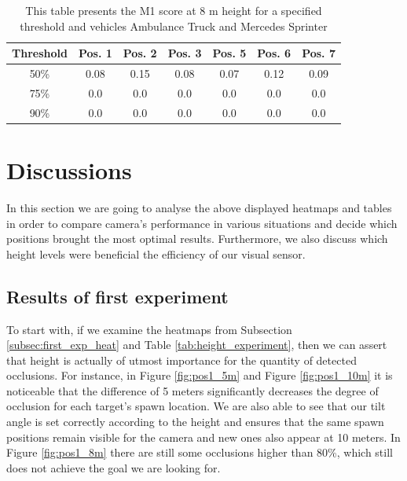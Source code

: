 \begin{table}[!htb]
\caption{This table presents the M1 score at 8 m height for a specified threshold and vehicles Ambulance Truck and Mercedes Sprinter\label{tab:amb_merc_threshold}}
\centering
    \begin{tabular}{ | c | c | c | c | c | c | c |}
    \hline
    Threshold & Pos. 1 & Pos. 2 & Pos. 3 & Pos. 5 & Pos. 6 & Pos. 7 \\ \hline
    50\% & 0.08 & 0.15 & 0.08 & 0.07 & 0.12 & 0.09\\ \hline
    75\% & 0.0 & 0.0 & 0.0 & 0.0 & 0.0 & 0.0\\ \hline
    90\% & 0.0 & 0.0 & 0.0 & 0.0 & 0.0 & 0.0\\ \hline
    \end{tabular}
\end{table}

\newpage
\section{Discussions}\label{discussions}
In this section we are going to analyse the above displayed heatmaps and tables in order to compare camera's performance in various situations and decide which positions brought the most optimal results. Furthermore, we also discuss which height levels were beneficial the efficiency of our visual sensor.

\subsection{Results of first experiment}
To start with, if we examine the heatmaps from Subsection \ref{subsec:first_exp_heat} and Table \ref{tab:height_experiment}, then we can assert that height is actually of utmost importance for the quantity of detected occlusions. For instance, in Figure \ref{fig:pos1_5m} and Figure \ref{fig:pos1_10m} it is noticeable that the difference of 5 meters significantly decreases the degree of occlusion for each target's spawn location. We are also able to see that our tilt angle is set correctly according to the height and ensures that the same spawn positions remain visible for the camera and new ones also appear at 10 meters. In Figure \ref{fig:pos1_8m} there are still some occlusions higher than 80\%, which still does not achieve the goal we are looking for. 

